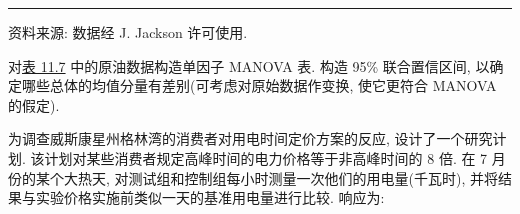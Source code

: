 \vspace{2pt}
\noindent\rule{\linewidth}{0.4pt}

\noindent\small 资料来源: 数据经 J. Jackson 许可使用.

\vspace{1em}
\quad 对\hyperref[tab:11.7]{表 11.7} 中的原油数据构造单因子 MANOVA 表. 构造 95\% 联合置信区间, 以确定哪些总体的均值分量有差别(可考虑对原始数据作变换, 使它更符合 MANOVA 的假定).

\quad 为调查威斯康星州格林湾的消费者对用电时间定价方案的反应, 设计了一个研究计划. 该计划对某些消费者规定高峰时间的电力价格等于非高峰时间的 8 倍. 在 7 月份的某个大热天, 对测试组和控制组每小时测量一次他们的用电量(千瓦时), 并将结果与实验价格实施前类似一天的基准用电量进行比较. 响应为:
